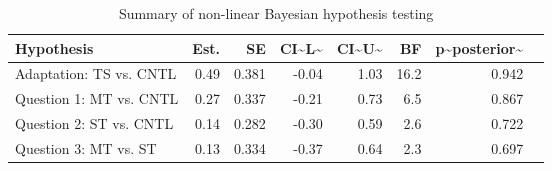 \begin{table}

\caption{\label{tab:unnamed-chunk-28}Summary of non-linear Bayesian hypothesis testing}
\centering
\begin{tabular}[t]{l|r|r|r|r|r|r|l}
\hline
Hypothesis & Est. & SE & CI\textasciitilde{}L\textasciitilde{} & CI\textasciitilde{}U\textasciitilde{} & BF & p\textasciitilde{}posterior\textasciitilde{} & \\
\hline
Adaptation: TS vs. CNTL & 0.49 & 0.381 & -0.04 & 1.03 & 16.2 & 0.942 & \\
\hline
Question 1: MT vs. CNTL & 0.27 & 0.337 & -0.21 & 0.73 & 6.5 & 0.867 & \\
\hline
Question 2: ST vs. CNTL & 0.14 & 0.282 & -0.30 & 0.59 & 2.6 & 0.722 & \\
\hline
Question 3: MT vs. ST & 0.13 & 0.334 & -0.37 & 0.64 & 2.3 & 0.697 & \\
\hline
\end{tabular}
\end{table}
